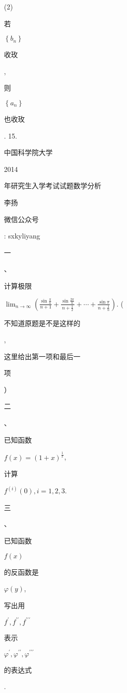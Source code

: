 \documentclass[10pt]{article}
\begin{document}
(2) \begin{CJK}{UTF8}{mj}若\end{CJK} $\left\{b_{n}\right\}$ \begin{CJK}{UTF8}{mj}收玫\end{CJK}, \begin{CJK}{UTF8}{mj}则\end{CJK} $\left\{a_{n}\right\}$ \begin{CJK}{UTF8}{mj}也收玫\end{CJK}. 15. \begin{CJK}{UTF8}{mj}中国科学院大学\end{CJK} 2014 \begin{CJK}{UTF8}{mj}年研究生入学考试试题数学分析\end{CJK}

\begin{CJK}{UTF8}{mj}李扬\end{CJK}

\begin{CJK}{UTF8}{mj}微信公众号\end{CJK}: sxkyliyang

\begin{CJK}{UTF8}{mj}一\end{CJK}、\begin{CJK}{UTF8}{mj}计算极限\end{CJK} $\lim _{n \rightarrow \infty}\left(\frac{\sin \frac{\pi}{n}}{n+1}+\frac{\sin \frac{2 \pi}{n}}{n+\frac{1}{2}}+\cdots+\frac{\sin \pi}{n+\frac{1}{n}}\right)$. (\begin{CJK}{UTF8}{mj}不知道原题是不是这样的\end{CJK}, \begin{CJK}{UTF8}{mj}这里给出第一项和最后一\end{CJK} \begin{CJK}{UTF8}{mj}项\end{CJK}）

\begin{CJK}{UTF8}{mj}二\end{CJK}、\begin{CJK}{UTF8}{mj}已知函数\end{CJK} $f(x)=(1+x)^{\frac{1}{x}}$, \begin{CJK}{UTF8}{mj}计算\end{CJK} $f^{(i)}(0), i=1,2,3$.

\begin{CJK}{UTF8}{mj}三\end{CJK}、\begin{CJK}{UTF8}{mj}已知函数\end{CJK} $f(x)$ \begin{CJK}{UTF8}{mj}的反函数是\end{CJK} $\varphi(y)$, \begin{CJK}{UTF8}{mj}写出用\end{CJK} $f^{\prime}, f^{\prime \prime}, f^{\prime \prime \prime}$ \begin{CJK}{UTF8}{mj}表示\end{CJK} $\varphi^{\prime}, \varphi^{\prime \prime}, \varphi^{\prime \prime \prime}$ \begin{CJK}{UTF8}{mj}的表达式\end{CJK}.
\end{document}
